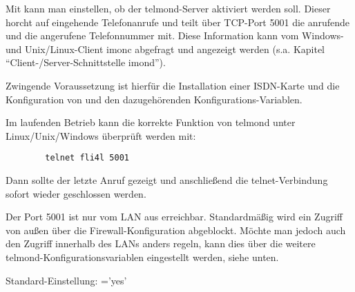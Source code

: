 Mit  kann man einstellen, ob der telmond-Server aktiviert
werden soll. Dieser horcht auf eingehende Telefonanrufe und teilt über
TCP-Port 5001 die anrufende und die angerufene Telefonnummer mit.
Diese Information kann vom Windows- und Unix/Linux-Client imonc
abgefragt und angezeigt werden (s.a. Kapitel
``Client-/Server-Schnittstelle imond'').

Zwingende Voraussetzung ist hierfür die Installation einer ISDN-Karte
und die Konfiguration von  und den dazugehörenden
Konfigurations-Variablen.

Im laufenden Betrieb kann die korrekte Funktion von telmond unter
Linux/Unix/Windows überprüft werden mit:

\begin{example}
\begin{verbatim}
        telnet fli4l 5001        
\end{verbatim}
\end{example}


Dann sollte der letzte Anruf gezeigt und anschließend die
telnet-Verbindung sofort wieder geschlossen werden.

Der Port 5001 ist nur vom LAN aus erreichbar. Standardmäßig wird ein
Zugriff von außen über die Firewall-Konfiguration abgeblockt. Möchte
man jedoch auch den Zugriff innerhalb des LANs anders regeln, kann
dies über die weitere telmond-Konfigurationsvariablen eingestellt
werden, siehe unten.

Standard-Einstellung: ='yes'

